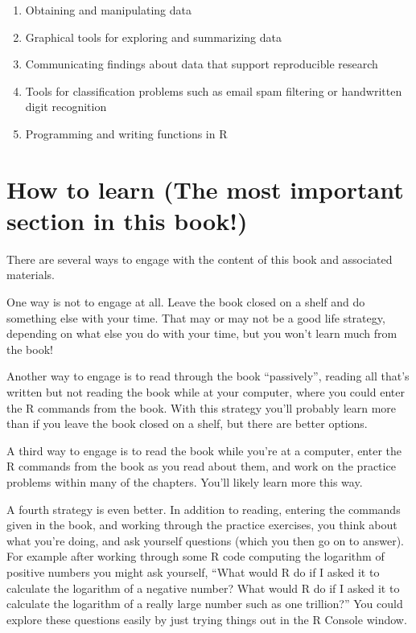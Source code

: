 \documentclass[]{krantz}
\providecommand{\tightlist}{%
  \setlength{\itemsep}{0pt}\setlength{\parskip}{0pt}}
\begin{document}
\begin{enumerate}
\def\labelenumi{\arabic{enumi}.}
\tightlist
\item
  Obtaining and manipulating data
\item
  Graphical tools for exploring and summarizing data
\item
  Communicating findings about data that support reproducible research
\item
  Tools for classification problems such as email spam filtering or
  handwritten digit recognition
\item
  Programming and writing functions in R
\end{enumerate}

\section{How to learn (The most important section in this
book!)}\label{how-to-learn-the-most-important-section-in-this-book}

There are several ways to engage with the content of this book and
associated materials.

One way is not to engage at all. Leave the book closed on a shelf and do
something else with your time. That may or may not be a good life
strategy, depending on what else you do with your time, but you won't
learn much from the book!

Another way to engage is to read through the book ``passively'', reading
all that's written but not reading the book while at your computer,
where you could enter the R commands from the book. With this strategy
you'll probably learn more than if you leave the book closed on a shelf,
but there are better options.

A third way to engage is to read the book while you're at a computer,
enter the R commands from the book as you read about them, and work on
the practice problems within many of the chapters. You'll likely learn
more this way.

A fourth strategy is even better. In addition to reading, entering the
commands given in the book, and working through the practice exercises,
you think about what you're doing, and ask yourself questions (which you
then go on to answer). For example after working through some R code
computing the logarithm of positive numbers you might ask yourself,
``What would R do if I asked it to calculate the logarithm of a negative
number? What would R do if I asked it to calculate the logarithm of a
really large number such as one trillion?'' You could explore these
questions easily by just trying things out in the R Console window.
\end{document}
